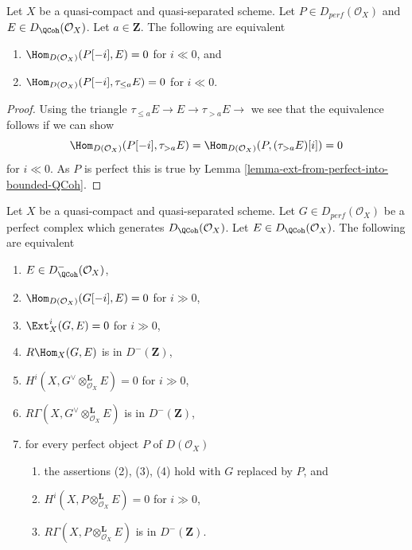 \begin{lemma}
\label{lemma-bounded-below-truncation}
Let $X$ be a quasi-compact and quasi-separated scheme. Let
$P \in D_{perf}(\mathcal{O}_X)$ and $E \in D_{\QCoh}(\mathcal{O}_X)$.
Let $a \in \mathbf{Z}$. The following are equivalent
\begin{enumerate}
\item $\Hom_{D(\mathcal{O}_X)}(P[-i], E) = 0$ for $i \ll 0$, and
\item $\Hom_{D(\mathcal{O}_X)}(P[-i], \tau_{\leq a} E) = 0$ for $i \ll 0$.
\end{enumerate}
\end{lemma}

\begin{proof}
Using the triangle $ \tau_{\leq a} E \to E \to \tau_{> a} E \to$
we see that the equivalence follows if we can show
$$
\Hom_{D(\mathcal{O}_X)}(P[-i], \tau_{> a} E) =
\Hom_{D(\mathcal{O}_X)}(P, (\tau_{> a} E)[i]) = 0
$$
for $i \ll 0$. As $P$ is perfect this is true by
Lemma \ref{lemma-ext-from-perfect-into-bounded-QCoh}.
\end{proof}

\begin{proposition}
\label{proposition-detecting-bounded-above}
Let $X$ be a quasi-compact and quasi-separated scheme. Let
$G \in D_{perf}(\mathcal{O}_X)$ be a perfect complex which generates 
$D_\QCoh (\mathcal{O}_X)$. Let $E \in D_\QCoh (\mathcal{O}_X)$.
The following are equivalent
\begin{enumerate}
\item $E \in D^-_\QCoh (\mathcal{O}_X)$,
\item $\Hom_{D(\mathcal{O}_X)}(G[-i], E) = 0$ for $i \gg 0$,
\item $\Ext^i_X(G, E) = 0$ for $i \gg 0$,
\item $R\Hom_X(G, E)$ is in $D^-(\mathbf{Z})$,
\item $H^i(X, G^\vee \otimes_{\mathcal{O}_X}^\mathbf{L} E) = 0$
for $i \gg 0$,
\item $R\Gamma(X, G^\vee \otimes_{\mathcal{O}_X}^\mathbf{L} E)$
is in $D^-(\mathbf{Z})$,
\item for every perfect object $P$ of $D(\mathcal{O}_X)$
\begin{enumerate}
\item the assertions (2), (3), (4) hold with $G$ replaced by $P$, and
\item $H^i(X, P \otimes_{\mathcal{O}_X}^\mathbf{L} E) = 0$ for $i \gg 0$,
\item $R\Gamma(X, P \otimes_{\mathcal{O}_X}^\mathbf{L} E)$
is in $D^-(\mathbf{Z})$.
\end{enumerate}
\end{enumerate}
\end{proposition}

